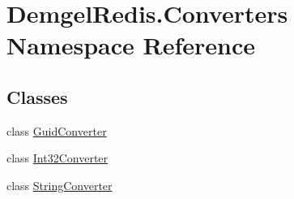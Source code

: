 \hypertarget{namespace_demgel_redis_1_1_converters}{}\section{Demgel\+Redis.\+Converters Namespace Reference}
\label{namespace_demgel_redis_1_1_converters}
\subsection*{Classes}
\begin{DoxyCompactItemize}
\item 
class \hyperlink{class_demgel_redis_1_1_converters_1_1_guid_converter}{Guid\+Converter}
\item 
class \hyperlink{class_demgel_redis_1_1_converters_1_1_int32_converter}{Int32\+Converter}
\item 
class \hyperlink{class_demgel_redis_1_1_converters_1_1_string_converter}{String\+Converter}
\end{DoxyCompactItemize}
